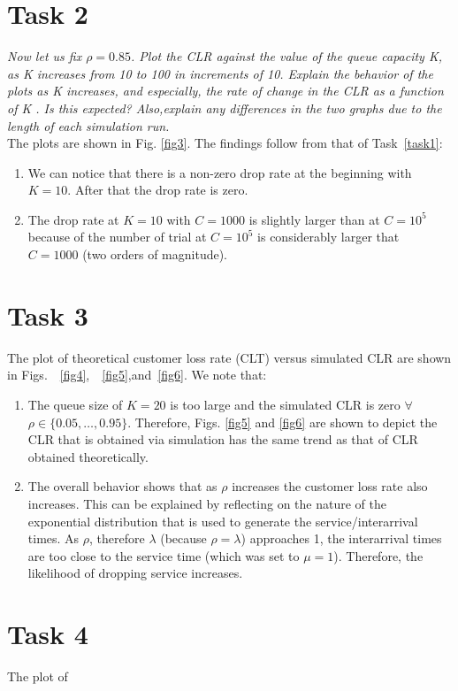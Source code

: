 \documentclass[10pt]{article}
\newcommand{\tion}[1]{Task~\ref{#1}}
\begin{document}
\section{Task 2}
\label{task2}



\textit{Now let us fix $\rho = 0.85$. Plot the CLR against the value of the queue capacity K, as K increases from 10 to 100 in increments of 10. Explain the behavior of the plots as K increases, and especially, the rate of change in the CLR as a function of K . Is this expected? Also,explain any differences in the two graphs due to the length of each simulation run.} \\
The plots are shown in Fig. \ref{fig3}. The findings follow from that of \tion{task1}: 
\begin{enumerate}
 \item We can notice that there is a non-zero drop rate at the beginning with $K=10$. After that the drop rate is zero.
 \item The drop rate at $K=10$ with $C=1000$ is slightly larger than at $C=10^5$ because of the number of trial at $C=10^5$ is considerably larger that $C=1000$ (two orders of magnitude).
\end{enumerate}

\section{Task 3}
\label{task3}


The plot of theoretical customer loss rate (CLT) versus simulated CLR are shown in Figs.~~\ref{fig4},~~\ref{fig5},and~\ref{fig6}. We note that: 
\begin{enumerate}
\item The queue size of $K=20$ is too large and the simulated CLR is zero $\forall$ $\rho\in\{0.05,\ldots,0.95\}$. Therefore, Figs. \ref{fig5} and \ref{fig6} are shown to depict the CLR that is obtained via simulation has the same trend as that of CLR obtained theoretically.

\item The overall behavior shows that as $\rho$ increases the customer loss rate also increases. This can be explained by reflecting on the nature of the exponential distribution that is used to generate the service/interarrival times. As $\rho$, therefore $\lambda$ (because $\rho=\lambda$) approaches 1, the interarrival times are too close to the service time (which was set to $\mu=1$). Therefore, the likelihood of dropping service increases.
\end{enumerate}


\section{Task 4}
\label{task4}

The plot of
\end{document}

